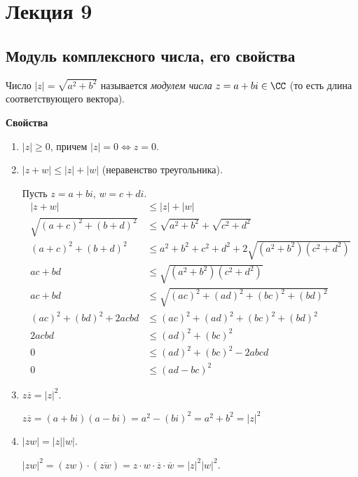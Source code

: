 \section{Лекция 9}

\subsection{Модуль комплексного числа, его свойства}

\begin{definition}
    Число $|z| = \sqrt{a^2 + b^2}$ называется \textit{модулем числа} $z = a + bi \in \CC$ (то есть длина соответствующего вектора).
\end{definition}

\textbf{Свойства}
\begin{enumerate}
\item $|z| \geq 0$, причем $|z| = 0 \iff z = 0$.
\item $|z + w| \leq |z| + |w|$ (неравенство треугольника).

    Пусть $z = a + bi$, $w = c + di$.
    \begin{align*}
        |z + w| &\leq |z| + |w| \\
        \sqrt{(a + c)^2 + (b + d)^2} &\leq \sqrt{a^2 + b^2} + \sqrt{c^2 + d^2} \\
        (a + c)^2 + (b + d)^2 &\leq a^2 + b^2 + c^2 + d^2 + 2\sqrt{(a^2 + b^2)(c^2 + d^2)} \\
        ac + bd &\leq\sqrt{(a^2 + b^2)(c^2 + d^2)} \\
        ac + bd &\leq\sqrt{(ac)^2 + (ad)^2 + (bc)^2 + (bd)^2} \\
        (ac)^2 + (bd)^2 + 2acbd &\leq (ac)^2 + (ad)^2 + (bc)^2 + (bd)^2 \\
        2acbd &\leq (ad)^2 + (bc)^2 \\
        0 &\leq (ad)^2 + (bc)^2 - 2abcd \\
        0 &\leq (ad - bc)^2
    \end{align*}
\item $z \overline{z} = |z|^2$.

    $z \overline{z} = (a + bi)(a - bi) = a^2 - (bi)^2 = a^2 + b^2 = |z|^2$
\item $|zw| = |z||w|$.

    $|zw|^2 = (zw) \cdot (\overline{zw}) = z \cdot w \cdot \overline{z} \cdot \overline{w} = |z|^2 |w|^2$.
\end{enumerate}

\begin{comment}
    Из 3) следует, что для $\forall z \neq 0$, $z^{-1} = \frac{\overline{z}}{|z|^2}$, то есть $(a + bi)^{-1} = \frac{a-bi}{a^2 + b^2}$
\end{comment}


